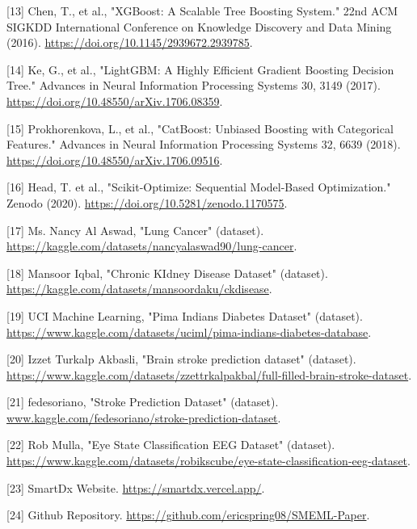 \documentclass{article}
\begin{document}
{[13] Chen, T., et al., "XGBoost: A Scalable Tree Boosting System." 22nd ACM SIGKDD International Conference on Knowledge Discovery and Data Mining (2016). \url{https://doi.org/10.1145/2939672.2939785}.

[14] Ke, G., et al., "LightGBM: A Highly Efficient Gradient Boosting Decision Tree." Advances in Neural Information Processing Systems 30, 3149 (2017). \url{https://doi.org/10.48550/arXiv.1706.08359}.

[15] Prokhorenkova, L., et al., "CatBoost: Unbiased Boosting with Categorical Features." Advances in Neural Information Processing Systems 32, 6639 (2018). \url{https://doi.org/10.48550/arXiv.1706.09516}.

[16] Head, T. et al., "Scikit-Optimize: Sequential Model-Based Optimization." Zenodo (2020). \url{https://doi.org/10.5281/zenodo.1170575}.

[17] Ms. Nancy Al Aswad, "Lung Cancer" (dataset). \url{https://kaggle.com/datasets/nancyalaswad90/lung-cancer}.

[18] Mansoor Iqbal, "Chronic KIdney Disease Dataset" (dataset). \url{https://kaggle.com/datasets/mansoordaku/ckdisease}.

[19] UCI Machine Learning, "Pima Indians Diabetes Dataset" (dataset). \url{https://www.kaggle.com/datasets/uciml/pima-indians-diabetes-database}.

[20] Izzet Turkalp Akbasli, "Brain stroke prediction dataset" (dataset). \url{https://www.kaggle.com/datasets/zzettrkalpakbal/full-filled-brain-stroke-dataset}.

[21] fedesoriano, "Stroke Prediction Dataset" (dataset). \url{www.kaggle.com/fedesoriano/stroke-prediction-dataset}.

[22] Rob Mulla, "Eye State Classification EEG Dataset" (dataset). \url{https://www.kaggle.com/datasets/robikscube/eye-state-classification-eeg-dataset}.

[23] SmartDx Website. \url{https://smartdx.vercel.app/}.

[24] Github Repository. \url{https://github.com/ericspring08/SMEML-Paper}.
}
\end{document}
